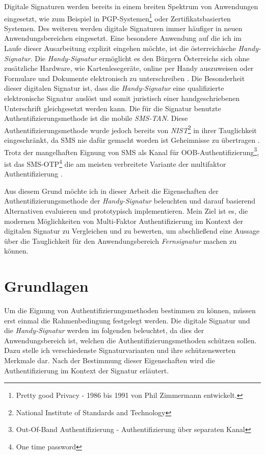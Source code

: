 \documentclass[11pt,a4paper,ngerman]{report}
\begin{document}
Digitale Signaturen werden bereits in einem breiten Spektrum von Anwendungen eingesetzt, wie zum Beispiel in PGP-Systemen\footnote{Pretty good Privacy - 1986 bis 1991 von Phil Zimmermann entwickelt.} oder Zertifikatsbasierten Systemen. Des weiteren werden digitale Signaturen immer häufiger in neuen Anwendungsbereichen eingesetzt. Eine besondere Anwendung auf die ich im Laufe dieser Ausarbeitung explizit eingehen möchte, ist die österreichische \textit{Handy-Signatur}. Die \textit{Handy-Signatur} ermöglicht es den Bürgern Österreichs sich ohne zusätzliche Hardware, wie Kartenlesegeräte, online per Handy auszuweisen oder Formulare und Dokumente elektronisch zu unterschreiben \cite{handySigOnline}. Die Besonderheit dieser digitalen Signatur ist, dass die \textit{Handy-Signatur} eine qualifizierte elektronische Signatur auslöst und somit juristisch einer handgeschriebenen Unterschrift gleichgesetzt werden kann. Die für die Signatur benutzte Authentifizierungsmethode ist die mobile \textit{SMS-TAN}. Diese Authentifizierungsmethode wurde jedoch bereits von \textit{NIST}\footnote{National Institute of Standards and Technology} in ihrer Tauglichkeit eingeschränkt, da SMS nie dafür gemacht worden ist Geheimnisse zu übertragen \cite{mobileSec,NIST800-63B}. Trotz der mangelhaften Eignung von SMS als Kanal für OOB-Authentifizierung\footnote{Out-Of-Band Authentifizierung - Authentifizierung über separaten Kanal}, ist das SMS-OTP\footnote{One time password} die am meisten verbreitete Variante der multifaktor Authentifizierung \cite[Abb. 3]{fido17}.

Aus diesem Grund möchte ich in dieser Arbeit die Eigenschaften der Authentifizierungsmethode der \textit{Handy-Signatur} beleuchten und darauf basierend Alternativen evaluieren und prototypisch implementieren. Mein Ziel ist es, die modernen Möglichkeiten von Multi-Faktor Authentifizierung im Kontext der digitalen Signatur zu Vergleichen und zu bewerten, um abschließend eine Aussage über die Tauglichkeit für den Anwendungsbereich \textit{Fernsignatur} machen zu können.
\clearpage


\chapter{Grundlagen}
Um die Eignung von Authentifizierungsmethoden bestimmen zu können, müssen erst einmal die Rahmenbedingung festgelegt werden. Die digitale Signatur und die \textit{Handy-Signatur} werden im folgenden beleuchtet, da dies der Anwendungsbereich ist, welchen die Authentifizierungsmethoden schützen sollen. Dazu stelle ich verschiedenste Signaturvarianten und ihre schützenswerten Merkmale dar. Nach der Bestimmung dieser Eigenschaften wird die Authentifizierung im Kontext der Signatur erläutert.
\end{document}
